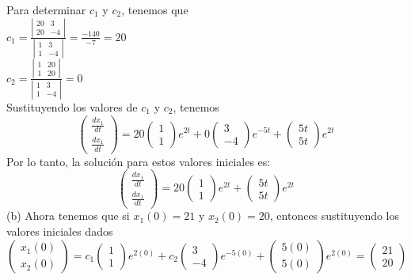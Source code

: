 Para determinar $c_1$ y $c_2$, tenemos que
\\
$c_1 = \frac{\left|\begin{matrix}
20 & 3\\
20 & -4
\end{matrix} \right|}{\left|\begin{matrix}
1 & 3\\
1 & -4
\end{matrix} \right|} = \frac{-140}{-7} = 20$\\
$c_2 = \frac{\left|\begin{matrix}
1 & 20\\
1 & 20
\end{matrix} \right|}{\left|\begin{matrix}
1 & 3\\
1 & -4
\end{matrix} \right|} = 0$\\
Sustituyendo los valores de $c_1$ y $c_2$, tenemos
$$\begin{pmatrix}
\frac{dx_1}{dt}\\
\frac{dx_1}{dt}
\end{pmatrix} = 20 \begin{pmatrix}
     1\\
     1
     \end{pmatrix}e^{2t} + 0 \begin{pmatrix}
     3\\
     -4
     \end{pmatrix}e^{-5t} + \begin{pmatrix}
     5t\\
     5t
     \end{pmatrix}e^{2t}$$
Por lo tanto, la solución para estos valores iniciales es:
$$\begin{pmatrix}
\frac{dx_1}{dt}\\
\frac{dx_1}{dt}
\end{pmatrix} = 20 \begin{pmatrix}
     1\\
     1
     \end{pmatrix}e^{2t} + \begin{pmatrix}
     5t\\
     5t
     \end{pmatrix}e^{2t}$$
(b) Ahora tenemos que si $x_1(0) = 21$ y $x_2(0) = 20$, entonces sustituyendo los valores iniciales dados
$$\begin{pmatrix}
x_1(0)\\
x_2(0)
\end{pmatrix} = c_1 \begin{pmatrix}
1\\
1
\end{pmatrix}e^{2(0)} + c_2 \begin{pmatrix}
3\\
-4
\end{pmatrix}e^{-5(0)} + \begin{pmatrix}
5(0)\\
5(0)
\end{pmatrix}e^{2(0)} = \begin{pmatrix}
21\\
20
\end{pmatrix}$$
